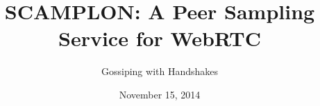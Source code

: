 \documentclass[11pt, english, screen]{report-rd-info}
\begin{document}
\title{SCAMPLON: A Peer Sampling Service for WebRTC} 
\subtitle{Gossiping with Handshakes}

\authorB{}{}
\date{November 15, 2014}

\end{document}
